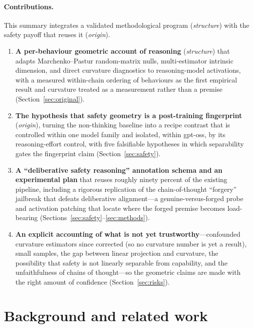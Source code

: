 \documentclass[10pt]{article}
\begin{document}
\paragraph{Contributions.} This summary integrates a validated methodological
program (\emph{structure}) with the safety payoff that reuses it (\emph{origin}).
\begin{enumerate}[leftmargin=1.4em,itemsep=2pt,topsep=2pt]
\item \textbf{A per-behaviour geometric account of reasoning} (\emph{structure})
that adapts Marchenko--Pastur random-matrix nulls, multi-estimator intrinsic
dimension, and direct curvature diagnostics to reasoning-model activations, with a
measured within-chain ordering of behaviours as the first empirical result and
curvature treated as a measurement rather than a premise
(Section~\ref{sec:original}).
\item \textbf{The hypothesis that safety geometry is a post-training fingerprint}
(\emph{origin}), turning the non-thinking baseline into a recipe contrast that is
controlled within one model family and isolated, within gpt-oss, by its
reasoning-effort control, with five falsifiable hypotheses in which separability
gates the fingerprint claim (Section~\ref{sec:safety}).
\item \textbf{A ``deliberative safety reasoning'' annotation schema and an
experimental plan} that reuses roughly ninety percent of the existing pipeline,
including a rigorous replication of the chain-of-thought ``forgery'' jailbreak that
defeats deliberative alignment---a genuine-versus-forged probe and activation
patching that locate where the forged premise becomes load-bearing
(Sections~\ref{sec:safety}--\ref{sec:methods}).
\item \textbf{An explicit accounting of what is not yet trustworthy}---confounded
curvature estimators since corrected (so no curvature number is yet a result),
small samples, the gap between linear projection and curvature, the possibility
that safety is not linearly separable from capability, and the unfaithfulness of
chains of thought---so the geometric claims are made with the right amount of
confidence (Section~\ref{sec:risks}).
\end{enumerate}

\section{Background and related work}
\label{sec:related}
\end{document}
